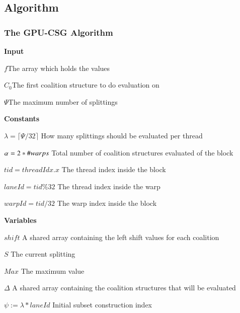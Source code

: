 \documentclass[a4paper, 12pt]{report}
\begin{document}
\subsection{Algorithm}
\subsubsection{The GPU-CSG Algorithm}\label{algorithm}

\textbf{Input}

$f$\hfill The array which holds the values

$C_0$\hfill The first coalition structure to do evaluation on

$\Psi$\hfill The maximum number of splittings

\textbf{Constants}

$\lambda = \lceil\Psi/32\rceil$ \hfill How many splittings should be evaluated
per thread

$\alpha = 2*\space \# \space warps$ \hfill Total number of coalition structures
evaluated of the block

$tid = threadIdx.x$ \hfill The thread index inside the block

$laneId = tid \% 32$ \hfill The thread index inside the warp

$warpId = tid / 32$ \hfill The warp index inside the block

\textbf{Variables} 

$shift$ \hfill A shared array containing the left shift values for each
coalition

$S$ \hfill The current splitting

$Max$ \hfill The maximum value

$\Delta$ \hfill A shared array containing the coalition structures that will be
evaluated 


$\psi := \lambda*laneId$ \hfill Initial subset construction index
\end{document}
